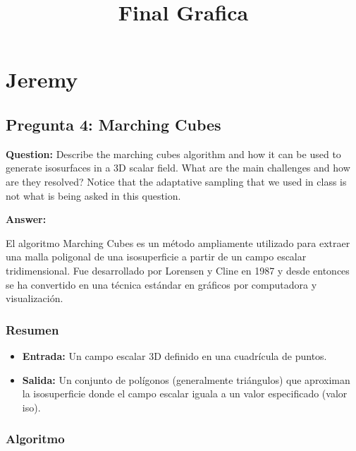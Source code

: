 \documentclass{article}
\begin{document}
\title{Final Grafica}
\author{}
\date{}
\maketitle

\tableofcontents

\section{Jeremy}

\subsection{Pregunta 4: Marching Cubes}

\textbf{Question:} Describe the marching cubes algorithm and how it can be used to generate isosurfaces in a 3D scalar field. What are the main challenges and how are they resolved? Notice that the adaptative sampling that we used in class is not what is being asked in this question.

\textbf{Answer:}

El algoritmo Marching Cubes es un método ampliamente utilizado para extraer una malla poligonal de una isosuperficie a partir de un campo escalar tridimensional. Fue desarrollado por Lorensen y Cline en 1987 y desde entonces se ha convertido en una técnica estándar en gráficos por computadora y visualización.

\subsubsection{Resumen}

\begin{itemize}
    \item \textbf{Entrada:} Un campo escalar 3D definido en una cuadrícula de puntos.
    \item \textbf{Salida:} Un conjunto de polígonos (generalmente triángulos) que aproximan la isosuperficie donde el campo escalar iguala a un valor especificado (valor iso).
\end{itemize}

\subsubsection{Algoritmo}
\end{document}
